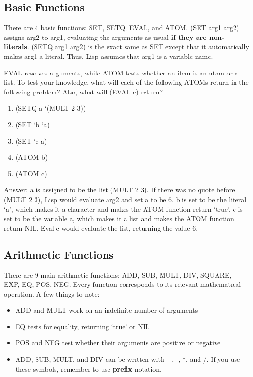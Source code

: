 \documentclass[11pt,letterpaper]{article}
\begin{document}
    \subsection{Basic Functions}
    There are 4 basic functions: SET, SETQ, EVAL, and ATOM.
    (SET arg1 arg2) assigns arg2 to arg1, evaluating the arguments as usual
    \textbf{if they are non-literals}.
    (SETQ arg1 arg2) is the exact same as SET except that it automatically makes arg1
    a literal.
    Thus, Lisp assumes that arg1 is a variable name.

    EVAL resolves arguments, while ATOM tests whether an item is an atom or a list.
    To test your knowledge, what will each of the following ATOMs return in
    the following problem?
    Also, what will (EVAL c) return?
    \begin{enumerate}
        \item (SETQ a `(MULT 2 3))
        \item (SET `b `a)
        \item (SET `c a)
        \item (ATOM b)
        \item (ATOM c)
    \end{enumerate}
    Answer: a is assigned to be the list (MULT 2 3).
    If there was no quote before (MULT 2 3), Lisp would evaluate arg2 and set
    a to be 6.
    b is set to be the literal `a', which makes it a character and makes
    the ATOM function return `true'.
    c is set to be the variable a, which makes it a list and makes the ATOM function
    return NIL.
    Eval c would evaluate the list, returning the value 6.

    \subsection{Arithmetic Functions}
    There are 9 main arithmetic functions: ADD, SUB, MULT, DIV, SQUARE,
    EXP, EQ, POS, NEG.
    Every function corresponds to its relevant mathematical operation.
    A few things to note:
    \begin{itemize}
        \item ADD and MULT work on an indefinite number of arguments
        \item EQ tests for equality, returning `true' or NIL
        \item POS and NEG test whether their arguments are positive or negative
        \item ADD, SUB, MULT, and DIV can be written with +, -, *, and /.
        If you use these symbols, remember to use \textbf{prefix} notation.
    \end{itemize}
\end{document}
